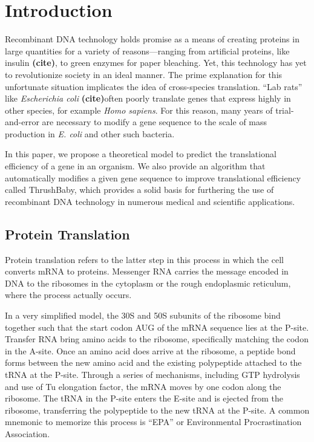 \documentclass[12pt,titlepage,draft]{article}
\providecommand{\hj}{\textbf{(cite)}}
\numberwithin{equation}{section}
\begin{document}
\section{Introduction}
\label{sec:intro}

Recombinant DNA technology holds promise as a means of creating proteins in large quantities for a variety of reasons---ranging from artificial proteins, like insulin \hj, to green enzymes for paper bleaching.
    Yet, this technology has yet to revolutionize society in an ideal manner.
    The prime explanation for this unfortunate situation implicates the idea of cross-species translation.
    ``Lab rats'' like \emph{Escherichia coli} \hj often poorly translate genes that express highly in other species, for example \emph{Homo sapiens}.
    For this reason, many years of trial-and-error are necessary to modify a gene sequence to the scale of mass production in \emph{E. coli} and other such bacteria.

In this paper, we propose a theoretical model to predict the translational efficiency of a gene in an organism.  We also provide an algorithm that automatically modifies a given gene sequence to improve translational efficiency called ThrushBaby, which provides a solid basis for furthering the use of recombinant DNA technology in numerous medical and scientific applications.

\subsection{Protein Translation}
\label{sec:translation}

Protein translation refers to the latter step in this process in which the cell converts mRNA to proteins. 
    Messenger RNA carries the message encoded in DNA to the ribosomes in the cytoplasm or the rough endoplasmic reticulum, where the process actually occurs.

In a very simplified model, the 30S and 50S subunits of the ribosome bind together such that the start codon AUG of the mRNA sequence lies at the P-site.  Transfer RNA bring amino acids to the ribosome, specifically matching the codon in the A-site.
    Once an amino acid does arrive at the ribosome, a peptide bond forms between the new amino acid and the existing polypeptide attached to the tRNA at the P-site.  Through a series of mechanisms, including GTP hydrolysis and use of Tu elongation factor, the mRNA moves by one codon along the ribosome.  The tRNA in the P-site enters the E-site and is ejected from the ribosome, transferring the polypeptide to the new tRNA at the P-site.
    A common mnemonic to memorize this process is ``EPA'' or Environmental Procrastination Association.
\end{document}
